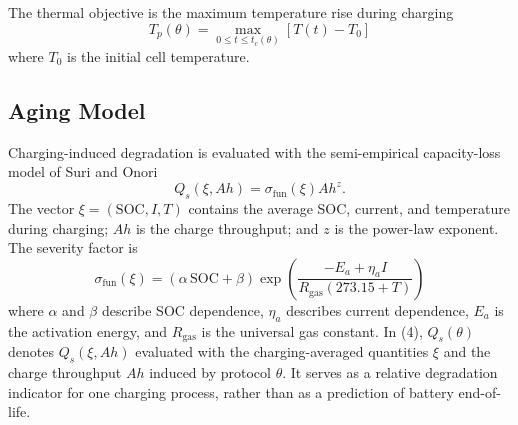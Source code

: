 The thermal objective is the maximum temperature rise during charging
\begin{equation}
T_p(\theta)=\max_{0\le t\le t_c(\theta)}[T(t)-T_0]
\label{eq:peak_temp}
\end{equation}
where $T_0$ is the initial cell temperature.

\subsection{Aging Model}
\label{sec:aging}

Charging-induced degradation is evaluated with the semi-empirical
capacity-loss model of Suri and Onori~\cite{refAgingModel}
\begin{equation}
Q_s(\xi,Ah)=\sigma_{\mathrm{fun}}(\xi)Ah^z.
\label{eq:aging}
\end{equation}
The vector $\xi=(\mathrm{SOC},I,T)$ contains the average SOC, current, and
temperature during charging; $Ah$ is the charge throughput; and $z$ is the
power-law exponent. The severity factor is
\begin{equation}
\sigma_{\mathrm{fun}}(\xi)=(\alpha\,\mathrm{SOC}+\beta)\exp\!\left(\frac{-E_a+\eta_a I}{R_{\mathrm{gas}}(273.15+T)}\right)
\label{eq:severity}
\end{equation}
where $\alpha$ and $\beta$ describe SOC dependence, $\eta_a$ describes current
dependence, $E_a$ is the activation energy, and $R_{\mathrm{gas}}$ is the
universal gas constant. In (4), $Q_s(\theta)$ denotes $Q_s(\xi,Ah)$
evaluated with the charging-averaged quantities $\xi$ and the charge
throughput $Ah$ induced by protocol $\theta$. It serves as a relative
degradation indicator for one charging process, rather than as a prediction
of battery end-of-life.
